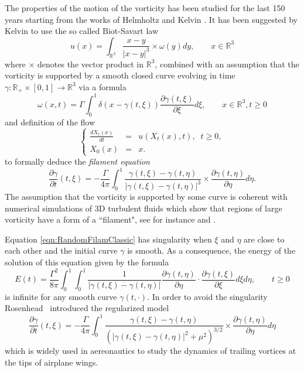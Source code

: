 \documentclass[11pt,a4paper,reqno]{amsart}%
\theoremstyle{plain}
\theoremstyle{remark}
\theoremstyle{plain}
\numberwithin{equation}{section}
\begin{document}
The properties of the motion of the vorticity has been studied for the last 150 years starting from the works of
Helmholtz \cite{Helm1858} and Kelvin \cite{Kelvin1869}. It has been suggested by Kelvin  to use the so called Biot-Savart law
\[
{u}({x})=\int_{\mathbb{R}^3}\frac{{x}-{y}}{\vert {x}-{y}\vert^3}\times{\omega}({y})d{y},\qquad{x}\in\mathbb{R}^3
\]
where $\times$ denotes the vector product in $\mathbb{R}^3$,
combined with an assumption that the vorticity is supported by a smooth closed curve evolving in time $\gamma:\mathbb{R}_+\times[0,1]\to\mathbb{R}^3$ via a formula 
\[
\omega({x},t)=\Gamma\int_0^1\delta({x}-\gamma(t,\xi))\frac{\partial \gamma(t,\xi)}{\partial \xi}d\xi,\qquad x\in\mathbb{R}^3,t\geq 0
\]
and definition of the flow
\begin{equation}\label{equa21}
\left\{
\begin{array}{rcl}
\frac{d {X}_t({x})}{dt}&=&{u}({X}_t({x}),t),\;\;t\geq 0,\\
{X}_0({x})&=&{x}.
\end{array}
\right.
\end{equation}
to formally deduce the \emph{filament equation}
\begin{equation}\label{eqn:RandomFilamClassic}
\frac{\partial \gamma}{\partial t}(t,\xi)=-\frac{\Gamma}{4\pi}\int_0^1\frac{\gamma(t,\xi)-\gamma(t,\eta)}{\vert \gamma(t,\xi)-\gamma(t,\eta)\vert^3}\times\frac{\partial\gamma(t,\eta)}{\partial \eta}d\eta.
\end{equation}
The assumption that the vorticity is supported by some curve is coherent with numerical simulations of 3D turbulent fluids
which show that regions of large  vorticity   have a form of a
``filament", see for instance \cite{[Bell+Markus_1992]} and 
\cite{[VincMeneguzzi-1991]}.

Equation \eqref{eqn:RandomFilamClassic} has singularity when $\xi$ and $\eta$ are close to each other and the initial curve $\gamma$ is smooth.
As a consequence, the energy of the solution of this equation given by the formula
\[
E(t)=\frac{\Gamma^2}{8\pi}\int_0^1\int_0^1\frac{1}{\vert \gamma(t,\xi)-\gamma(t,\eta)\vert }\frac{\partial \gamma(t,\eta)}{\partial \eta}\cdot\frac{\partial \gamma(t,\xi)}{\partial \xi}d\xi d\eta ,\qquad t\geq 0
\]
is infinite for any smooth curve $\gamma(t,\cdot)$. In order to avoid the singularity
Rosenhead~\cite{[Rosenhead-1930]}  introduced the regularized  model
\begin{equation}\label{eqn:RandomFilamRosenhead}
\frac{\partial \gamma}{\partial t}(t,\xi)=-\frac{\Gamma}{4\pi}\int_0^1\frac{\gamma(t,\xi)-\gamma(t,\eta)}{(\vert \gamma(t,\xi)-\gamma(t,\eta)\vert^2+\mu^2)^{3/2}}\times\frac{\partial\gamma(t,\eta)}{\partial \eta}d\eta
\end{equation}
which is widely used in aereonautics to study the dynamics of trailing vortices at the tips of airplane wings.
\end{document}
